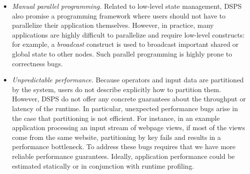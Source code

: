 \begin{itemize}
\item \emph{Manual parallel programming.}
Related to low-level state management, DSPS also promise a programming framework
where users should not have to parallelize their application themselves.
However, in practice, many applications are highly difficult to parallelize and require low-level constructs: for example, a \emph{broadcast} construct is used to broadcast important shared or global state to other nodes.
Such parallel programming is highly prone to correctness bugs.

\item \emph{Unpredictable performance.}
Because operators and input data are partitioned by the system, users
do not describe explicitly how to partition them.
However, DSPS do not offer any concrete guarantees about the throughput or latency of the runtime.
In particular, unexpected performance bugs arise in the
case that partitioning is not efficient.
For instance, in an example application processing
an input stream of webpage views, if most of the views come from the same website,
partitioning by key fails and results in a performance bottleneck.
To address these bugs requires that we have more reliable performance guarantees.
Ideally, application performance could be estimated statically or in conjunction with runtime profiling.
\end{itemize}


